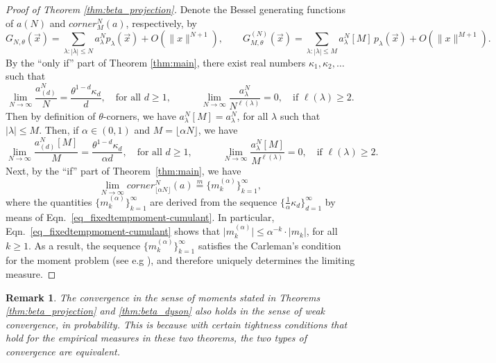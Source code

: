 \documentclass[11pt]{article}
\theoremstyle{plain}
\newtheorem{remark}[lemma]{Remark}
\newcommand{\la}{\lambda}
\newcommand{\vecx}{\vec{x}}
\begin{document}
\begin{proof}[Proof of Theorem \ref{thm:beta_projection}]
     Denote the Bessel generating functions of $a(N)$ and $corner^N_M(a)$, respectively, by
     \[
     G_{N,\theta}(\vecx) = \sum_{\la\colon|\la|\le N}a^N_\la p_\la(\vecx)+O(\|x\|^{N+1}),\qquad
     G^{(N)}_{M,\theta}(\vecx)=\sum_{\la\colon|\la|\le M} a^N_\la[M]\,p_\la(\vecx)+O(\|x\|^{M+1}).
     \]
     By the ``only if'' part of Theorem \ref{thm:main}, there exist real numbers $\kappa_1,\kappa_2,\dots$ such that
    \begin{equation*}
    \lim_{N\to\infty}{\frac{a_{(d)}^N}{N}} = \frac{\theta^{1-d}\kappa_d}{d},\quad\text{for all }d\ge 1,\qquad\quad
    \lim_{N\to\infty}{\frac{a_\la^N}{N^{\ell(\la)}}}=0,\quad\text{if }\ell(\la)\ge 2.
    \end{equation*}
    Then by definition of $\theta$-corners, we have $a^N_\la[M] = a^N_\la$, for all $\la$ such that $|\la|\le M$.
    Then, if $\alpha\in (0,1)$ and $M = \lfloor \alpha N\rfloor$, we have
    \begin{equation*}
        \lim_{N\to\infty}{\frac{a_{(d)}^N[M]}{M}} = \frac{\theta^{1-d}\kappa_d}{\alpha d},\quad\text{for all } d\ge 1,\qquad\quad
        \lim_{N\to\infty}{\frac{a_\la^N[M]}{M^{\ell(\la)}}}=0,\quad\text{if }\ell(\la)\ge 2.
    \end{equation*}
    Next, by the ``if'' part of Theorem~\ref{thm:main}, we have
    $$\lim_{N\rightarrow\infty}corner^{N}_{\lfloor \alpha N\rfloor}(a)\stackrel{m}{=}\big\{m_k^{(\alpha)}\big\}_{k=1}^{\infty},$$
    where the quantities $\big\{m_k^{(\alpha)}\big\}_{k=1}^{\infty}$ are derived from the sequence $\{\frac{1}{\alpha}\kappa_d\}_{d=1}^{\infty}$ by means of Eqn.~\eqref{eq_fixedtempmoment-cumulant}.
    In particular, Eqn.~\eqref{eq_fixedtempmoment-cumulant} shows that $\big|m_k^{(\alpha)}\big|\le\alpha^{-k}\cdot|m_k|$, for all $k\ge 1$. As a result, the sequence $\big\{m_k^{(\alpha)}\big\}_{k=1}^\infty$ satisfies the Carleman's condition for the moment problem (see e.g \cite{Sc}), and therefore  uniquely determines the limiting measure. 
\end{proof}


\begin{remark}
    The convergence in the sense of moments stated in Theorems \ref{thm:beta_projection} and \ref{thm:beta_dyson} also holds in the sense of weak convergence, in probability. This is because with certain tightness conditions that hold for the empirical measures in these two theorems, the two types of convergence are equivalent.
\end{remark}
\end{document}
